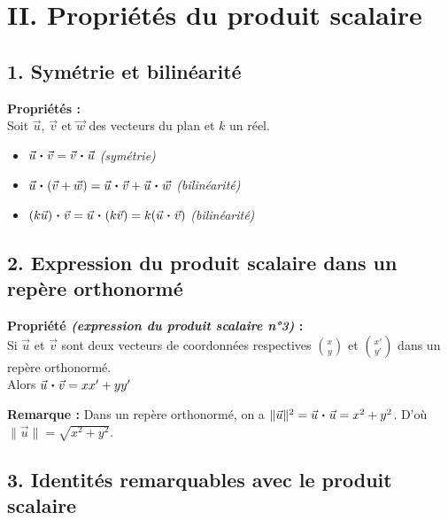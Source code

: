 \documentclass[11pt,a4paper]{article}
\newcommand{\pdt}{\mathbin{\vcenter{\hbox{\scalebox{0.6}{\textbullet}}}}}
\begin{document}
\newpage
\section*{II. Propriétés du produit scalaire}

\subsection*{1. Symétrie et bilinéarité}

\begin{mdframed}[style=proprieteStyle]
    \textbf{Propriétés :} ~\\
    Soit $\vec{u}$, $\vec{v}$ et $\vec{w}$ des vecteurs du plan et $k$ un réel.
    \vspace{-3pt}
    \begin{itemize}
        \item $\vec{u}\pdt\vec{v}=\vec{v}\pdt\vec{u}$ \quad \emph{(symétrie)}
        \item $\vec{u}\pdt(\vec{v}+\vec{w})=\vec{u}\pdt\vec{v}+\vec{u}\pdt\vec{w}$ \quad \emph{(bilinéarité)}
        \item $(k\vec{u})\pdt\vec{v}=\vec{u}\pdt(k\vec{v})=k(\vec{u}\pdt\vec{v})$ \quad \emph{(bilinéarité)}
    \end{itemize}
\end{mdframed}

\subsection*{2. Expression du produit scalaire dans un repère orthonormé}

\begin{mdframed}[style=proprieteStyle]
    \textbf{Propriété \emph{(expression du produit scalaire n°3)} :} ~\\
    Si $\vec{u}$ et $\vec{v}$ sont deux vecteurs de coordonnées respectives $\displaystyle \binom{x}{y}$ et $\displaystyle \binom{x'}{y'}$ dans un repère orthonormé. \\
    Alors $\vec{u}\pdt\vec{v}=xx'+yy'$
\end{mdframed}

\textbf{Remarque :} Dans un repère orthonormé, on a $\| \vec{u} \|^2=\vec{u}\pdt\vec{u}=x^2+y^2$. D'où $\| \vec{u} \|=\sqrt{x^2+y^2}$.

\subsection*{3. Identités remarquables avec le produit scalaire}
\end{document}
